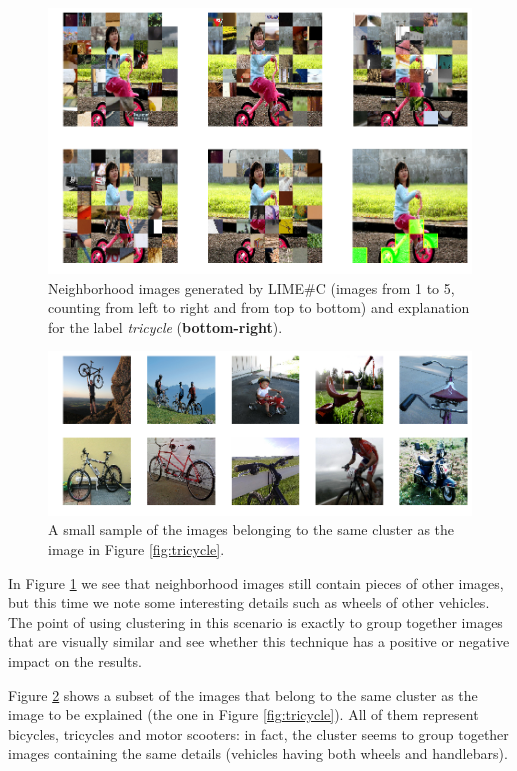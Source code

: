 \documentclass[12pt, twoside, a4paper]{report}
\begin{document}
\begin{figure}
\begin{center}
\includegraphics[width=.85\textwidth]{images/limesharpC_neighborhood.png} 
\caption{Neighborhood images generated by LIME\#C (images from 1 to 5, counting from left to right and from top to bottom) and explanation for the label \textit{tricycle} (\textbf{bottom-right}).}
\label{fig:limesharpC_neigh}
\end{center}
\end{figure}

\begin{figure}
\includegraphics[width=\textwidth]{images/limesharpC_same_clus.png} 
\caption{A small sample of the images belonging to the same cluster as the image in Figure \ref{fig:tricycle}.}
\label{fig:limesharpC_same_clus}
\end{figure}

In Figure \ref{fig:limesharpC_neigh} we see that neighborhood images still contain pieces of other images, but this time we note some interesting details such as wheels of other vehicles. The point of using clustering in this scenario is exactly to group together images that are visually similar and see whether this technique has a positive or negative impact on the results.

Figure \ref{fig:limesharpC_same_clus} shows a subset of the images that belong to the same cluster as the image to be explained (the one in Figure \ref{fig:tricycle}). All of them represent bicycles, tricycles and motor scooters: in fact, the cluster seems to group together images containing the same details (vehicles having both wheels and handlebars).
\end{document}
